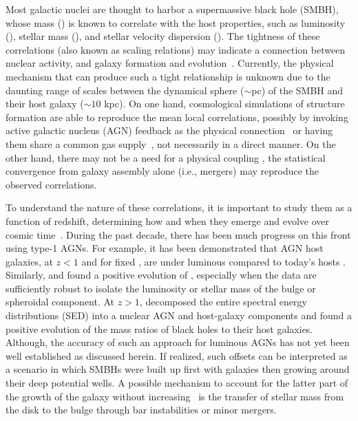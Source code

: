 \documentclass[apj]{emulateapj}
\begin{document}
Most galactic nuclei are thought to harbor a supermassive black hole (SMBH), whose mass (\mbh) is known to correlate with the host properties, such as luminosity (\lhost), stellar mass (\smass), and stellar velocity dispersion (\sigstar). The tightness of these correlations (also known as scaling relations) may indicate a connection between nuclear activity, and galaxy formation and evolution~\citep[e.g.,][]{Mag++98, F+M00, M+H03, Gul++09,Beifi2012, H+R04, Geb++01b, Gra++2011}. Currently, the physical mechanism that can produce such a tight relationship is unknown due to the daunting range of scales between the dynamical sphere ($\sim$pc) of the SMBH and their host galaxy ($\sim10$ kpc). On one hand, cosmological simulations of structure formation are able to reproduce the mean local correlations, possibly by invoking active galactic nucleus (AGN) feedback as the physical connection~\citep{Springel2005, Hopkins2008, Matteo2008, DeG++15} or having them share a common gas supply~\citep{Cen2015, Menci2016}, not necessarily in a direct manner.
On the other hand, there may not be a need for a physical coupling \citep{Peng2007, Jahnke2011, Hirschmann2010}, the statistical convergence from galaxy assembly alone (i.e., mergers) may reproduce the observed correlations.

To understand the nature of these correlations, it is important to study them as a function of redshift, determining how and when they emerge and evolve over cosmic time~\citep[e.g.,][]{TMB04,Sal++06,Woo++06, Jah++09,SS13,Sun2015}. During the past decade, there has been much progress on this front using type-1 AGNs. For example, it has been demonstrated that AGN host galaxies, at $z<1$ and for fixed \mbh, are under luminous compared to today's hosts \citep{Park15, Tre++07, Pen++06qsob}. Similarly, \citet{Bennert11} and \citet{Woo++08} found a positive evolution of \mbh, especially when the data are sufficiently robust to isolate the luminosity or stellar mass of the bulge or spheroidal component. At $z>1$, \citet{Merloni2010} decomposed the entire spectral energy distributions (SED) into a nuclear AGN and host-galaxy components and found a positive evolution of the mass ratios of black holes to their host galaxies. Although, the accuracy of such an approach for luminous AGNs has not yet been well established as discussed herein. If realized, such offsets can be interpreted as a scenario in which SMBHs were built up first with galaxies then growing around their deep potential wells.  A possible mechanism to account for the latter part of the growth of the galaxy without increasing \mbh\ is the transfer of stellar mass from the disk to the bulge \citep{Jah++09,Bennert++2011,SS13} through bar instabilities or minor mergers. 
\end{document}
